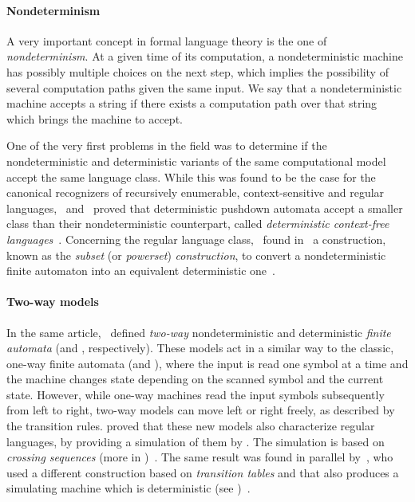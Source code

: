 \paragraph{Nondeterminism} A very important concept in formal language theory is the one of \emph{nondeterminism}.
At a given time of its computation, a nondeterministic machine has possibly multiple choices on the next step, which implies the possibility of several computation paths given the same input.
We say that a nondeterministic machine accepts a string if there exists a computation path over that string which brings the machine to accept.

One of the very first problems in the field was to determine if the nondeterministic and deterministic variants of the same computational model accept the same language class.
While this was found to be the case for the canonical recognizers of recursively enumerable, context-sensitive and regular languages,~\citeauthor{Fis63} and~\citeauthor{Sch63} proved that deterministic pushdown automata accept a smaller class than their nondeterministic counterpart, called \emph{deterministic context-free languages}~\cite{Fis63,Sch63}.
Concerning the regular language class,~\citeauthor{RabSco59} found in~\citeyear{RabSco59} a construction, known as the \emph{subset} (or \emph{powerset}) \emph{construction}, to convert a nondeterministic finite automaton into an equivalent deterministic one~\cite{RabSco59}.

\paragraph{Two-way models} In the same article,~\citeauthor{RabSco59} defined \emph{two-way} nondeterministic and deterministic \emph{finite automata} (\TNFAs and \TDFAs, respectively).
These models act in a similar way to the classic, one-way finite automata (\ONFAs and \ODFAs), where the input is read one symbol at a time and the machine changes state depending on the scanned symbol and the current state. However, while one-way machines read the input symbols subsequently from left to right, two-way models can move left or right freely, as described by the transition rules.
\citeauthor{RabSco59} proved that these new models also characterize regular languages, by providing a simulation of them by \ONFAs. The simulation is based on \emph{crossing sequences} (more in )~\cite{RabSco59}.
The same result was found in parallel by~\citeauthor{She59}, who used a different construction based on \emph{transition tables} and that also produces a simulating machine which is deterministic (see )~\cite{She59}.




